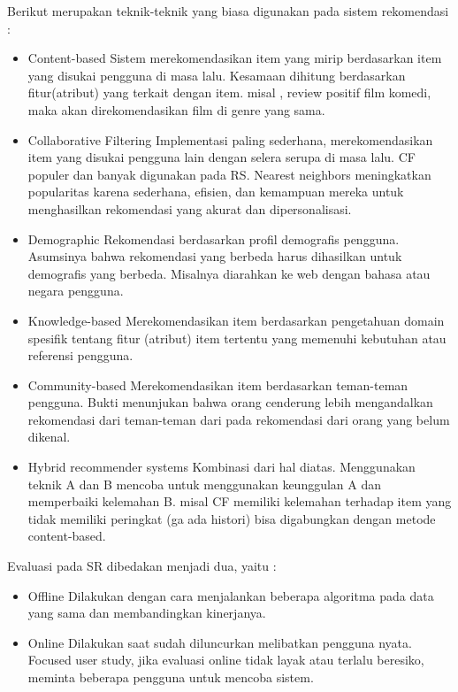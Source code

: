 \documentclass[a4paper,twoside]{article}
\begin{document}
\begin{enumerate}
		Berikut merupakan teknik-teknik yang biasa digunakan pada sistem rekomendasi :
		\begin{itemize}
			\item Content-based
				Sistem merekomendasikan item yang mirip berdasarkan item yang disukai pengguna di masa lalu. Kesamaan dihitung berdasarkan fitur(atribut) yang terkait dengan item. misal , review positif film komedi, maka akan direkomendasikan film di genre yang sama. 
			\item Collaborative Filtering
				Implementasi paling sederhana, merekomendasikan item yang disukai pengguna lain dengan selera serupa di masa lalu. CF populer dan banyak digunakan pada RS. Nearest neighbors meningkatkan popularitas karena sederhana, efisien, dan kemampuan mereka untuk menghasilkan rekomendasi yang akurat dan dipersonalisasi.
			\item Demographic
				Rekomendasi berdasarkan profil demografis pengguna. Asumsinya bahwa rekomendasi yang berbeda harus dihasilkan untuk demografis yang berbeda. Misalnya diarahkan ke web dengan bahasa atau negara pengguna.
			\item Knowledge-based
				Merekomendasikan item berdasarkan pengetahuan domain spesifik tentang fitur (atribut) item tertentu yang memenuhi kebutuhan atau referensi pengguna. 
			\item Community-based
				Merekomendasikan item berdasarkan teman-teman pengguna. Bukti menunjukan bahwa orang cenderung lebih mengandalkan rekomendasi dari teman-teman dari pada rekomendasi dari orang yang belum dikenal. 
			\item Hybrid recommender systems
				Kombinasi dari hal diatas. Menggunakan teknik A dan B mencoba untuk menggunakan keunggulan A dan memperbaiki kelemahan B. misal CF memiliki kelemahan terhadap item yang tidak memiliki peringkat (ga ada histori)  bisa digabungkan dengan metode content-based.
		\end{itemize}
		
		Evaluasi pada SR dibedakan menjadi dua, yaitu :
		\begin{itemize}
			\item Offline
				Dilakukan dengan cara menjalankan beberapa algoritma pada data yang sama dan membandingkan kinerjanya.
			\item Online
				Dilakukan saat sudah diluncurkan melibatkan pengguna nyata. Focused user study, jika evaluasi online tidak layak atau terlalu beresiko, meminta beberapa pengguna untuk mencoba sistem.
		\end{itemize}
		

\end{enumerate}
\end{document}
